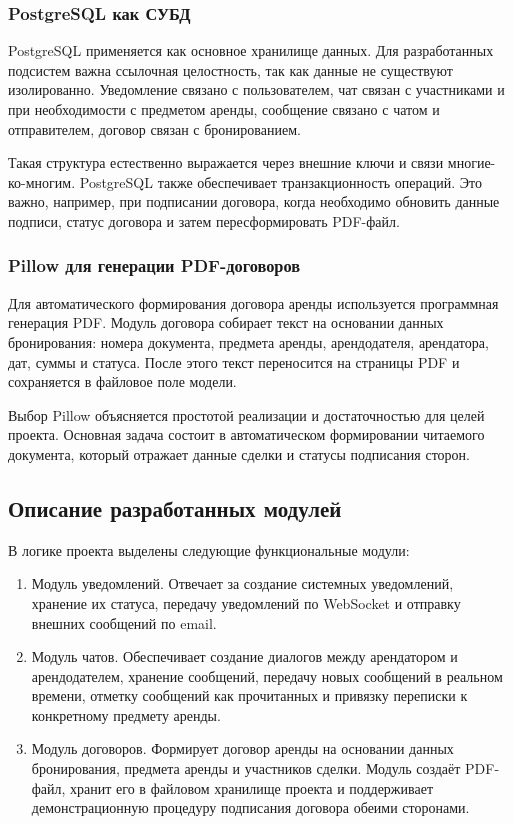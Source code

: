 \subsubsection{PostgreSQL как СУБД}
PostgreSQL применяется как основное хранилище данных. Для разработанных подсистем важна ссылочная целостность, так как данные не существуют изолированно. Уведомление связано с пользователем, чат связан с участниками и при необходимости с предметом аренды, сообщение связано с чатом и отправителем, договор связан с бронированием.

Такая структура естественно выражается через внешние ключи и связи многие-ко-многим. PostgreSQL также обеспечивает транзакционность операций. Это важно, например, при подписании договора, когда необходимо обновить данные подписи, статус договора и затем пересформировать PDF-файл.

\subsubsection{Pillow для генерации PDF-договоров}
Для автоматического формирования договора аренды используется программная генерация PDF. Модуль договора собирает текст на основании данных бронирования: номера документа, предмета аренды, арендодателя, арендатора, дат, суммы и статуса. После этого текст переносится на страницы PDF и сохраняется в файловое поле модели.

Выбор Pillow объясняется простотой реализации и достаточностью для целей проекта. Основная задача состоит в автоматическом формировании читаемого документа, который отражает данные сделки и статусы подписания сторон.

\subsection{Описание разработанных модулей}
В логике проекта выделены следующие функциональные модули:
\begin{enumerate}
\item Модуль уведомлений. Отвечает за создание системных уведомлений, хранение их статуса, передачу уведомлений по WebSocket и отправку внешних сообщений по email.
\item Модуль чатов. Обеспечивает создание диалогов между арендатором и арендодателем, хранение сообщений, передачу новых сообщений в реальном времени, отметку сообщений как прочитанных и привязку переписки к конкретному предмету аренды.
\item Модуль договоров. Формирует договор аренды на основании данных бронирования, предмета аренды и участников сделки. Модуль создаёт PDF-файл, хранит его в файловом хранилище проекта и поддерживает демонстрационную процедуру подписания договора обеими сторонами.
\end{enumerate}


